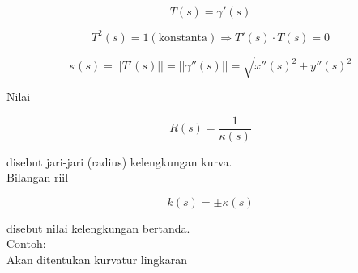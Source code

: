 \documentclass[12pt,Times new roman,letterpaper]{book}
\begin{document}
\begin{eulernootebook}
\begin{eulercomment}
\begin{eulercomment}
\begin{eulernootebook}
\begin{eulercomment}
\begin{eulercomment}
\begin{eulercomment}
\begin{eulercomment}
\begin{eulercomment}
\begin{eulercomment}
\begin{eulernotebook}
\begin{eulercomment}
\begin{eulercomment}
\begin{eulercomment}
\begin{eulercomment}
\begin{eulercomment}
\begin{eulercomment}
\begin{eulercomment}
\begin{eulercomment}
\begin{eulercomment}
\begin{eulercomment}
\begin{eulercomment}
\begin{eulercomment}
\begin{eulercomment}
\begin{eulercomment}
\begin{eulercomment}
\begin{eulercomment}
\begin{eulercomment}
\begin{eulercomment}
\begin{eulercomment}
\begin{eulercomment}
\begin{eulercomment}
\end{eulercomment}
\begin{eulerformula}
\[
T(s)=\gamma'(s)
\]
\end{eulerformula}
\begin{eulerformula}
\[
T^2(s)=1(\text{konstanta})\Rightarrow T'(s)\cdot T(s)=0
\]
\end{eulerformula}
\begin{eulerformula}
\[
\kappa(s)=||T'(s)||=||\gamma''(s)||=\sqrt{x''(s)^2+y''(s)^2}
\]
\end{eulerformula}
\begin{eulercomment}
Nilai

\end{eulercomment}
\begin{eulerformula}
\[
R(s)=\frac{1}{\kappa(s)}
\]
\end{eulerformula}
\begin{eulercomment}
disebut jari-jari (radius) kelengkungan kurva.\\
Bilangan riil

\end{eulercomment}
\begin{eulerformula}
\[
k(s)=\pm \kappa(s)
\]
\end{eulerformula}
\begin{eulercomment}
disebut nilai kelengkungan bertanda.\\
Contoh:\\
Akan ditentukan kurvatur lingkaran


\end{eulercomment}
\end{eulercomment}
\end{eulercomment}
\end{eulercomment}
\end{eulercomment}
\end{eulercomment}
\end{eulercomment}
\end{eulercomment}
\end{eulercomment}
\end{eulercomment}
\end{eulercomment}
\end{eulercomment}
\end{eulercomment}
\end{eulercomment}
\end{eulercomment}
\end{eulercomment}
\end{eulercomment}
\end{eulercomment}
\end{eulercomment}
\end{eulercomment}
\end{eulercomment}
\end{eulernotebook}
\end{eulercomment}
\end{eulercomment}
\end{eulercomment}
\end{eulercomment}
\end{eulercomment}
\end{eulercomment}
\end{eulernootebook}
\end{eulercomment}
\end{eulercomment}
\end{eulernootebook}
\end{document}
